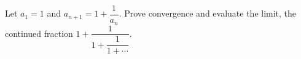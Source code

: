 Let $a_1=1$ and $a_{n+1}=1+\dfrac{1}{a_n}$. Prove convergence and evaluate the limit, the continued fraction $1+\dfrac{1}{1+\dfrac{1}{1+\cdots}}$.
